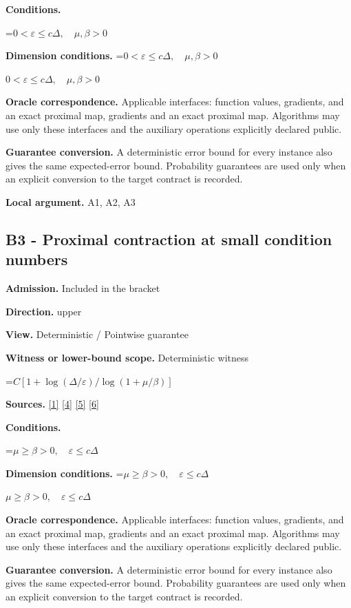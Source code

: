 \documentclass[10pt,a4paper]{article}
\newcommand{\AtlasMath}[1]{\par\begingroup\centering\setbox0=\hbox{$\displaystyle #1$}\ifdim\wd0>1.4\linewidth\typeout{ATLAS WIDE FORMULA: \the\wd0}\fi\ifdim\wd0>\linewidth\resizebox{\linewidth}{!}{\box0}\else\box0\fi\par\endgroup}
\newcommand{\AtlasInlineMath}[1]{\begingroup\setbox0=\hbox{$#1$}\ifdim\wd0>.4\linewidth\endgroup\AtlasMath{#1}\else\endgroup$#1$\fi}
\begin{document}
\textbf{Conditions.} 
\AtlasMath{0<\varepsilon\le c\Delta,\quad\mu,\beta>0}


\textbf{Dimension conditions.} \AtlasInlineMath{0<\varepsilon\le c\Delta,\quad\mu,\beta>0}

\textbf{Oracle correspondence.} Applicable interfaces: function values, gradients, and an exact proximal map, gradients and an exact proximal map. Algorithms may use only these interfaces and the auxiliary operations explicitly declared public.

\textbf{Guarantee conversion.} A deterministic error bound for every instance also gives the same expected-error bound. Probability guarantees are used only when an explicit conversion to the target contract is recorded.

\textbf{Local argument.} A1, A2, A3

\subsection{B3 - Proximal contraction at small condition numbers}
\textbf{Admission.} Included in the bracket

\textbf{Direction.} upper

\textbf{View.} Deterministic / Pointwise guarantee

\textbf{Witness or lower-bound scope.} Deterministic witness

\AtlasMath{C[1+\log(\Delta/\varepsilon)/\log(1+\mu/\beta)]}
\textbf{Sources.} \href{https://www.tau.ac.il/~becka/FISTA.pdf}{[1]} \href{https://arxiv.org/pdf/1405.4980}{[4]} \href{https://www2.isye.gatech.edu/~nemirovs/MOR_AccuracyCertificates.pdf}{[5]} \href{https://arxiv.org/pdf/2609.20701}{[6]}

\textbf{Conditions.} 
\AtlasMath{\mu\ge\beta>0,\quad\varepsilon\le c\Delta}


\textbf{Dimension conditions.} \AtlasInlineMath{\mu\ge\beta>0,\quad\varepsilon\le c\Delta}

\textbf{Oracle correspondence.} Applicable interfaces: function values, gradients, and an exact proximal map, gradients and an exact proximal map. Algorithms may use only these interfaces and the auxiliary operations explicitly declared public.

\textbf{Guarantee conversion.} A deterministic error bound for every instance also gives the same expected-error bound. Probability guarantees are used only when an explicit conversion to the target contract is recorded.
\end{document}
